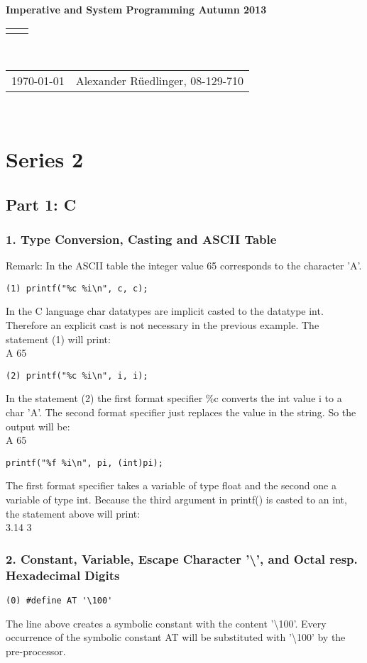 \documentclass[12pt]{article}
\renewcommand{\title}[1]{\textbf{#1}\\}
\renewcommand{\line}{\begin{tabularx}{\textwidth}{X>{\raggedleft}X}\hline\\\end{tabularx}\\[-0.5cm]}
\newcommand{\leftright}[2]{\begin{tabularx}{\textwidth}{X>{\raggedleft}X}#1%
& #2\\\end{tabularx}\\[-0.5cm]}
\begin{document}
\title{Imperative and System Programming Autumn 2013}
\line
\leftright{\today}{Alexander Rüedlinger, 08-129-710} %
\section*{Series 2}
\subsection*{Part 1: C}
\subsubsection*{1. Type Conversion, Casting and ASCII Table}
Remark: In the ASCII table the integer value 65 corresponds to the character 'A'.
\begin{lstlisting}
(1) printf("%c %i\n", c, c);
\end{lstlisting}

In the C language char datatypes are implicit casted to the datatype int. Therefore an explicit cast is not necessary in the previous example.
The statement (1) will print:\\
A 65

\begin{lstlisting}
(2) printf("%c %i\n", i, i);
\end{lstlisting}
In the statement (2) the first format specifier \%c converts the int value i to a char 'A'. The second format specifier just replaces the value in the string.
So the output will be:\\
A 65

\begin{lstlisting}
printf("%f %i\n", pi, (int)pi);
\end{lstlisting}
The first format specifier takes a variable of type float and the second one a variable of type int.
Because the third argument in printf() is casted to an int, the statement above will print:\\

3.14 3

\subsubsection*{2. Constant, Variable, Escape Character '\textbackslash', and Octal resp. Hexadecimal Digits}
\begin{lstlisting}
(0) #define AT '\100'
\end{lstlisting}
The line above creates a symbolic constant with the content '\textbackslash 100'.
Every occurrence of the symbolic constant AT will be substituted with '\textbackslash 100' by the pre-processor.
\end{document}

